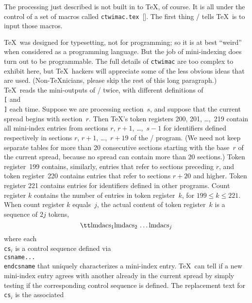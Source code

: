 The processing just described is not built in to \TeX, of course. It is all
under the control of a set of macros called {\tt ctwimac.tex}~[\Ctwill].
The first thing \CTWILL/ tells \TeX\ is to input those macros.

\TeX\ was designed for typesetting, not for programming; so it is at best
``weird'' when considered as a programming language. But the job of
mini-indexing does turn out to be programmable.
The full details of {\tt ctwimac} are too complex to exhibit
here, but \TeX\ hackers will appreciate some of the less obvious ideas that
are used. (Non-\TeX nicians, please skip the rest of this long paragraph.) \TeX\
reads the mini-outputs of \CTWILL/ twice, with different definitions of
{\tt\\[} and {\tt\\]} each time. Suppose
we are processing section~$s$, and suppose that the current spread begins with
section~$r$. Then \TeX's
 token registers 200, 201, \dots,~219 contain all mini-index
entries from sections $r$, $r+1$, \dots,~$s-1$
for identifiers defined respectively in sections $r$, $r+1$, \dots,~$r+19$
of the \CWEB/ program. (We need not keep separate tables for
more than 20 consecutive sections starting with the base~$r$ of the current
spread, because no spread can contain more than 20 sections.) Token
register~199 contains, similarly, entries that refer to sections preceding
$r$, and token register~220 contains entries that refer to sections $r+20$
and higher.
Token register 221 contains entries for identifiers defined in other
programs. Count register $k$ contains the number of entries in token
register~$k$, for $199\le k\le221$. When count register $k$ equals~$j$, the
actual content of token register~$k$ is a sequence of $2j$ tokens,
$$\hbox{\tt\\lmda\\cs$_1$\\lmda\\cs$_2\,\ldots\,$\\lmda\\cs$_j$}$$
where each {\tt\\cs$_i$} is a control sequence defined via
{\tt\\csname...\\endcsname} that uniquely characterizes a mini-index entry.
\TeX\ can tell if a new mini-index entry agrees with another already in the
current spread by simply testing if the corresponding control sequence is
defined. The replacement text for {\tt\\cs$_i$} is the associated
